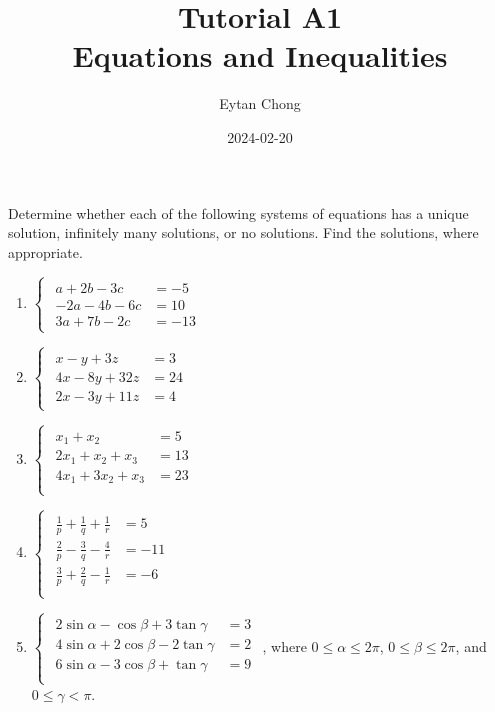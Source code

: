 \documentclass{jhwhw}
\title{Tutorial A1\\Equations and Inequalities}
\author{Eytan Chong}
\date{2024-02-20}
\begin{document}
    \problem{}
        Determine whether each of the following systems of equations has a unique solution, infinitely many solutions, or no solutions. Find the solutions, where appropriate.

        \begin{enumerate}
            \item $\begin{cases}
                \begin{aligned}
                    a + 2b - 3c &= -5\\
                    -2a - 4b - 6c &= 10\\
                    3a + 7b - 2c &= -13
                \end{aligned}
            \end{cases}$
            \item $\begin{cases}
                \begin{aligned}
                x - y + 3z &= 3\\
                4x - 8y + 32z &= 24\\
                2x - 3y + 11z &= 4
                \end{aligned}
            \end{cases}$
            \item $\begin{cases}
                \begin{aligned}
                    x_1 + x_2 &= 5\\
                    2x_1 + x_2 + x_3 &= 13\\
                    4x_1 + 3x_2 + x_3 &= 23\\
                \end{aligned}
            \end{cases}$
            \item $\begin{cases}
                \begin{aligned}
                    \frac1p + \frac1q + \frac1r &= 5\\
                    \frac2p - \frac3q - \frac4r &= -11\\
                    \frac3p + \frac2q - \frac1r &= -6\\
                \end{aligned}
            \end{cases}$
            \item $\begin{cases}
                \begin{aligned}
                    2\sin\alpha - \cos\beta + 3\tan\gamma &= 3\\
                    4\sin\alpha + 2\cos\beta - 2\tan\gamma &= 2\\
                    6\sin\alpha - 3\cos\beta + \tan\gamma &= 9\\
                \end{aligned}
            \end{cases}$, where $0 \leq \alpha \leq 2\pi$, $0 \leq \beta \leq 2\pi$, and $0 \leq \gamma < \pi$.
        \end{enumerate}
    
\end{document}
